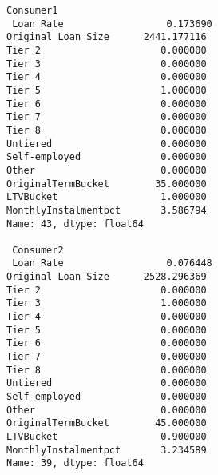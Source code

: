 \documentclass[11pt]{article}
\begin{document}
    \begin{Verbatim}[commandchars=\\\{\}]
Consumer1
 Loan Rate                  0.173690
Original Loan Size      2441.177116
Tier 2                     0.000000
Tier 3                     0.000000
Tier 4                     0.000000
Tier 5                     1.000000
Tier 6                     0.000000
Tier 7                     0.000000
Tier 8                     0.000000
Untiered                   0.000000
Self-employed              0.000000
Other                      0.000000
OriginalTermBucket        35.000000
LTVBucket                  1.000000
MonthlyInstalmentpct       3.586794
Name: 43, dtype: float64 

 Consumer2
 Loan Rate                  0.076448
Original Loan Size      2528.296369
Tier 2                     0.000000
Tier 3                     1.000000
Tier 4                     0.000000
Tier 5                     0.000000
Tier 6                     0.000000
Tier 7                     0.000000
Tier 8                     0.000000
Untiered                   0.000000
Self-employed              0.000000
Other                      0.000000
OriginalTermBucket        45.000000
LTVBucket                  0.900000
MonthlyInstalmentpct       3.234589
Name: 39, dtype: float64

    \end{Verbatim}
\end{document}
